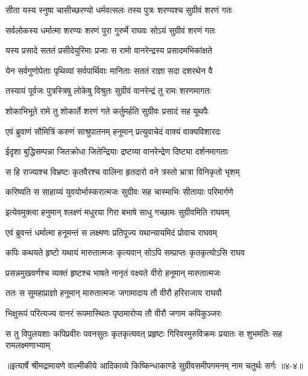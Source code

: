 \twolineshloka
{सीता यस्य स्नुषा चासीच्छरण्यो धर्मवत्सलः}
{तस्य पुत्रः शरण्यश्च सुग्रीवं शरणं गतः} %

\twolineshloka
{सर्वलोकस्य धर्मात्मा शरण्यः शरणं पुरा}
{गुरुर्मे राघवः सोऽयं सुग्रीवं शरणं गतः} %

\twolineshloka
{यस्य प्रसादे सततं प्रसीदेयुरिमाः प्रजाः}
{स रामो वानरेन्द्रस्य प्रसादमभिकांक्षते} %

\twolineshloka
{येन सर्वगुणोपेताः पृथिव्यां सर्वपार्थिवाः}
{मानिताः सततं राज्ञा सदा दशरथेन वै} %

\twolineshloka
{तस्यायं पूर्वजः पुत्रस्त्रिषु लोकेषु विश्रुतः}
{सुग्रीवं वानरेन्द्रं तु रामः शरणमागतः} %

\twolineshloka
{शोकाभिभूते रामे तु शोकार्ते शरणं गते}
{कर्तुमर्हति सुग्रीवः प्रसादं सह यूथपैः} %

\twolineshloka
{एवं ब्रुवाणं सौमित्रिं करुणं साश्रुपातनम्}
{हनूमान् प्रत्युवाचेदं वाक्यं वाक्यविशारदः} %

\twolineshloka
{ईदृशा बुद्धिसम्पन्ना जितक्रोधा जितेन्द्रियाः}
{द्रष्टव्या वानरेन्द्रेण दिष्ट्या दर्शनमागताः} %

\twolineshloka
{स हि राज्याश्च विभ्रष्टः कृतवैरश्च वालिना}
{हृतदारो वने त्रस्तो भ्रात्रा विनिकृतो भृशम्} %

\twolineshloka
{करिष्यति स साहाय्यं युवयोर्भास्करात्मजः}
{सुग्रीवः सह चास्माभिः सीतायाः परिमार्गणे} %

\twolineshloka
{इत्येवमुक्त्वा हनुमान् श्लक्ष्णं मधुरया गिरा}
{बभाषे साधु गच्छामः सुग्रीवमिति राघवम्} %

\twolineshloka
{एवं ब्रुवन्तं धर्मात्मा हनूमन्तं स लक्ष्मणः}
{प्रतिपूज्य यथान्यायमिदं प्रोवाच राघवम्} %

\twolineshloka
{कपिः कथयते हृष्टो यथायं मारुतात्मजः}
{कृत्यवान् सोऽपि सम्प्राप्तः कृतकृत्योऽसि राघव} %

\twolineshloka
{प्रसन्नमुखवर्णश्च व्यक्तं हृष्टश्च भाषते}
{नानृतं वक्ष्यते वीरो हनूमान् मारुतात्मजः} %

\twolineshloka
{ततः स सुमहाप्राज्ञो हनूमान् मारुतात्मजः}
{जगामादाय तौ वीरौ हरिराजाय राघवौ} %

\twolineshloka
{भिक्षुरूपं परित्यज्य वानरं रूपमास्थितः}
{पृष्ठमारोप्य तौ वीरौ जगाम कपिकुञ्जरः} %

\twolineshloka
{स तु विपुलयशाः कपिप्रवीरः पवनसुतः कृतकृत्यवत् प्रहृष्टः}
{गिरिवरमुरुविक्रमः प्रयातः स शुभमतिः सह रामलक्ष्मणाभ्याम्} %


॥इत्यार्षे श्रीमद्रामायणे वाल्मीकीये आदिकाव्ये किष्किन्धाकाण्डे सुग्रीवसमीपगमनम् नाम चतुर्थः सर्गः ॥४-४॥

